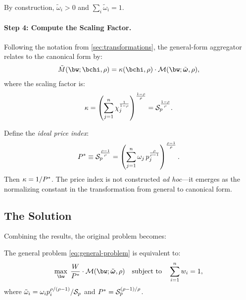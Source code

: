 By construction, $\tilde{\omega}_i > 0$ and $\sum_i \tilde{\omega}_i = 1$.

\paragraph{Step 4: Compute the Scaling Factor.}
Following the notation from \cref{sec:transformations}, the general-form aggregator relates to the canonical form by:
\[
\tilde{M}(\bw; \bchi, \rho) = \kappa(\bchi, \rho) \cdot \M(\bw; \tilde{\bom}, \rho),
\]
where the scaling factor is:
\begin{equation}
\label{eq:kappa-transform}
\kappa = \left( \sum_{j=1}^{n} \chi_j^{\frac{1}{1-\rho}} \right)^{\frac{1-\rho}{\rho}} = \mathcal{S}_p^{\frac{1-\rho}{\rho}}.
\end{equation}

\begin{calloutnote}
Define the \emph{ideal price index}:
\begin{equation}
\label{eq:price-index-transform}
P^{*} \equiv \mathcal{S}_p^{\frac{\rho-1}{\rho}} = \left( \sum_{j=1}^{n} \omega_j \, p_j^{\frac{\rho}{\rho-1}} \right)^{\frac{\rho-1}{\rho}}.
\end{equation}
Then $\kappa = 1/P^{*}$. The price index is not constructed \emph{ad hoc}---it emerges as the normalizing constant in the transformation from general to canonical form.
\end{calloutnote}

\subsection{The Solution}
\label{subsec:transform-solution}

Combining the results, the original problem becomes:

\begin{proposition}
\label{prop:transformed-problem}
The general problem \cref{eq:general-problem} is equivalent to:
\begin{equation}
\label{eq:equivalent-problem}
\max_{\bw} \; \frac{W}{\Pstar} \cdot \M(\bw; \tilde{\bom}, \rho) \quad \text{subject to} \quad \sum_{i=1}^{n} w_i = 1,
\end{equation}
where $\tilde{\omega}_i = \omega_i p_i^{\rho/(\rho-1)} / \mathcal{S}_p$ and $P^{*} = \mathcal{S}_p^{(\rho-1)/\rho}$.
\end{proposition}

